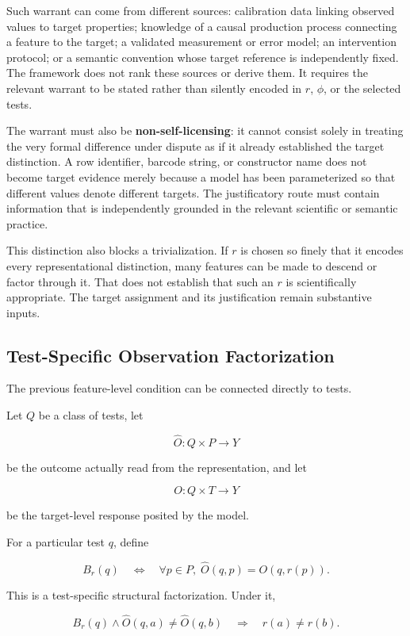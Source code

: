 \documentclass[12pt]{article}
\begin{document}
Such warrant can come from different sources: calibration data linking observed values to target properties; knowledge of a causal production process connecting a feature to the target; a validated measurement or error model; an intervention protocol; or a semantic convention whose target reference is independently fixed. The framework does not rank these sources or derive them. It requires the relevant warrant to be stated rather than silently encoded in \(r\), \(\phi\), or the selected tests.

The warrant must also be \textbf{non-self-licensing}: it cannot consist solely in treating the very formal difference under dispute as if it already established the target distinction. A row identifier, barcode string, or constructor name does not become target evidence merely because a model has been parameterized so that different values denote different targets. The justificatory route must contain information that is independently grounded in the relevant scientific or semantic practice.

This distinction also blocks a trivialization. If \(r\) is chosen so finely that it encodes every representational distinction, many features can be made to descend or factor through it. That does not establish that such an \(r\) is scientifically appropriate. The target assignment and its justification remain substantive inputs.

\subsection{Test-Specific Observation Factorization}

The previous feature-level condition can be connected directly to tests.

Let \(Q\) be a class of tests, let

\[
\widehat O:Q\times P\to Y
\]

be the outcome actually read from the representation, and let

\[
O:Q\times T\to Y
\]

be the target-level response posited by the model.

For a particular test \(q\), define

\[
B_r(q)
\quad\Longleftrightarrow\quad
\forall p\in P,\;
\widehat O(q,p)=O(q,r(p)).
\]

This is a test-specific structural factorization. Under it,

\[
B_r(q)
\land
\widehat O(q,a)\neq \widehat O(q,b)
\quad\Longrightarrow\quad
r(a)\neq r(b).
\]
\end{document}

